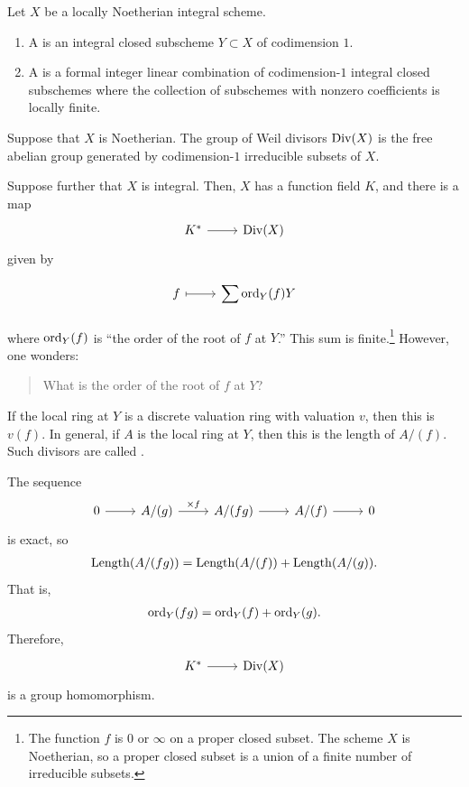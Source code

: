 \documentclass [11 pt, oneside] {article}
\begin{document}
\begin{definition}\label{}\text{}
Let $X$ be a locally Noetherian integral scheme.
\begin{enumerate}
	\item A  is an integral closed subscheme $Y\subset X$ of codimension $1$.
	\item A  is a formal integer linear combination of codimension-$1$ integral closed subschemes where the collection of subschemes with nonzero coefficients is locally finite.
\end{enumerate}
\end{definition}

\begin{definition}[ ]\label{}\text{}
Suppose that $X$ is Noetherian. The group of Weil divisors $\operatorname{Div} (X)$ is the free abelian group generated by codimension-$1$ irreducible subsets of $X$.
\end{definition}
Suppose further that $X$ is integral. Then, $X$ has a function field $K$, and there is a map
\[
\begin{tikzcd}
	K^* \ar[r]& \Div(X)
\end{tikzcd}
\]
given by
\[
\begin{tikzcd}[arrows = mapsto]
	f\ar[r]& \displaystyle\sum_{}^{}  \ord_Y(f) Y
\end{tikzcd}
\]
where $\operatorname{ord}_Y(f)$ is ``the order of the root of $f$ at $Y$.'' This sum is finite.\footnote{The function $f$ is $0$ or $\infty$ on a proper closed subset. The scheme $X$ is Noetherian, so a proper closed subset is a union of a finite number of irreducible subsets.} However, one wonders:
\begin{quote}
	\small What is the order of the root of $f$ at $Y$?
\end{quote}
If the local ring at $Y$ is a discrete valuation ring with valuation $v$, then this is $v(f)$. In general, if $A$ is the local ring at $Y$, then this is the length of $A/(f)$. Such divisors are called . 

The sequence
\[
\begin{tikzcd}
	0\ar[r] & A/(g) \ar[r, "\times f"]& A/ (fg) \ar[r] & A / (f)\ar[r]&0
\end{tikzcd}
\]
is exact, so
\begin{align*}
	\operatorname{Length}  (A/(fg)) = \operatorname{Length}(A/(f)) + \operatorname{Length}(A/(g)).
\end{align*}
That is,
\begin{align*}
	\operatorname{ord}_Y(fg) = \operatorname{ord}_Y (f)+\operatorname{ord} _Y (g).
\end{align*}
Therefore,
\[
\begin{tikzcd}
	K^* \ar[r]& \Div(X)
\end{tikzcd}
\]
is a group homomorphism.
\end{document}
